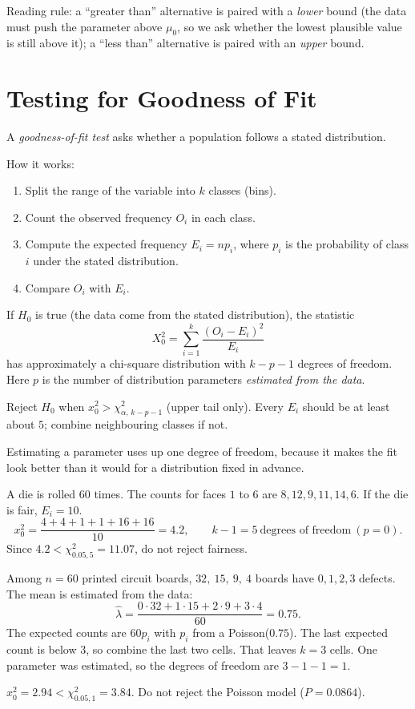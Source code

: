 Reading rule: a ``greater than'' alternative is paired with a \emph{lower} bound (the data must push the parameter above $\mu_0$, so we ask whether the lowest plausible value is still above it); a ``less than'' alternative is paired with an \emph{upper} bound.



\section{Testing for Goodness of Fit}

A \emph{goodness-of-fit test} asks whether a population follows a stated distribution.

How it works:
\begin{enumerate}
  \item Split the range of the variable into $k$ classes (bins).
  \item Count the observed frequency $O_i$ in each class.
  \item Compute the expected frequency $E_i=np_i$, where $p_i$ is the probability of class $i$ under the stated distribution.
  \item Compare $O_i$ with $E_i$.
\end{enumerate}

\begin{theorem}\label{thm:gof}
If $H_0$ is true (the data come from the stated distribution), the statistic
\[ X_0^2=\sum_{i=1}^k\frac{(O_i-E_i)^2}{E_i} \]
has approximately a chi-square distribution with $k-p-1$ degrees of freedom. Here $p$ is the number of distribution parameters \emph{estimated from the data}.

Reject $H_0$ when $x_0^2>\chi^2_{\alpha,\,k-p-1}$ (upper tail only). Every $E_i$ should be at least about $5$; combine neighbouring classes if not.
\end{theorem}

Estimating a parameter uses up one degree of freedom, because it makes the fit look better than it would for a distribution fixed in advance.

\begin{example}
A die is rolled $60$ times. The counts for faces $1$ to $6$ are $8,12,9,11,14,6$. If the die is fair, $E_i=10$.
\[ x_0^2=\frac{4+4+1+1+16+16}{10}=4.2,\qquad k-1=5\ \text{degrees of freedom}\ (p=0). \]
Since $4.2<\chi^2_{0.05,5}=11.07$, do not reject fairness.
\end{example}

\begin{example}
Among $n=60$ printed circuit boards, $32,\ 15,\ 9,\ 4$ boards have $0,1,2,3$ defects. The mean is estimated from the data:
\[ \hat\lambda=\frac{0\cdot32+1\cdot15+2\cdot9+3\cdot4}{60}=0.75. \]
The expected counts are $60p_i$ with $p_i$ from a Poisson($0.75$). The last expected count is below $3$, so combine the last two cells. That leaves $k=3$ cells. One parameter was estimated, so the degrees of freedom are $3-1-1=1$.

$x_0^2=2.94<\chi^2_{0.05,1}=3.84$. Do not reject the Poisson model ($P=0.0864$).
\end{example}

